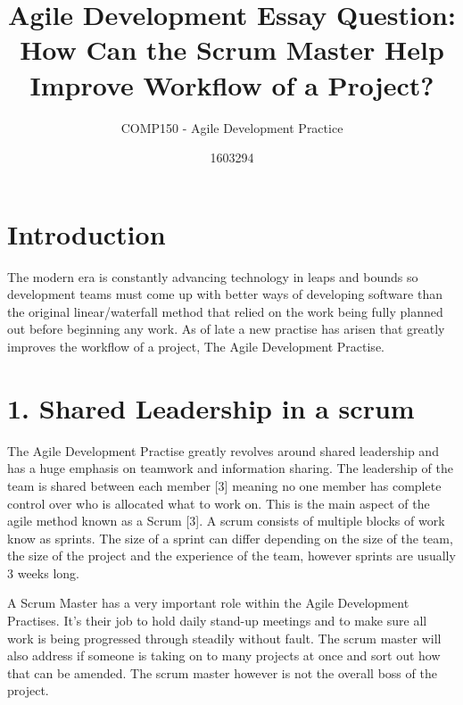 \documentclass{scrartcl}
\title{Agile Development Essay Question: How Can the Scrum Master Help Improve Workflow of a Project?}
\subtitle{COMP150 - Agile Development Practice}
\author{1603294}
\begin{document}
\maketitle


\section{Introduction}

The modern era is constantly advancing technology in leaps and bounds so development teams must come up with better ways of developing software than the original linear/waterfall method that relied on the work being fully planned out before beginning any work. As of late a new practise has arisen that greatly improves the workflow of a project, The Agile Development Practise. 

\section{1. Shared Leadership in a scrum}

The Agile Development Practise greatly revolves around shared leadership and has a huge emphasis on teamwork and information sharing. The leadership of the team is shared between each member [3] meaning no one member has complete control over who is allocated what to work on. This is the main aspect of the agile method known as a Scrum [3]. A scrum consists of multiple blocks of work know as sprints. The size of a sprint can differ depending on the size of the team, the size of the project and the experience of the team, however sprints are usually 3 weeks long.

A Scrum Master has a very important role within the Agile Development Practises. It's their job to hold daily stand-up meetings and to make sure all work is being progressed through steadily without fault. The scrum master will also address if someone is taking on to many projects at once and sort out how that can be amended. The scrum master however is not the overall boss of the project.
\end{document}
